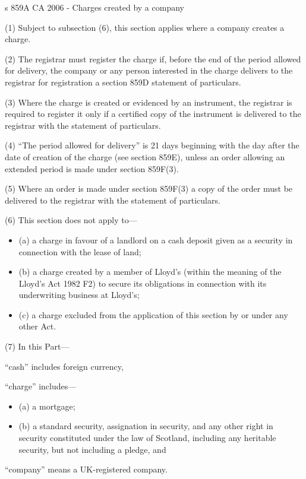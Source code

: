 \documentclass[
]{article}
\providecommand{\tightlist}{%
  \setlength{\itemsep}{0pt}\setlength{\parskip}{0pt}}
\newenvironment{env-99ba4262-5297-4318-9547-86307715f49a}
{
    \savenotes\tcolorbox[blanker,breakable,left=5pt,borderline west={2pt}{-4pt}{green}]
}
{
    \endtcolorbox\spewnotes
}
\begin{document}
\begin{env-99ba4262-5297-4318-9547-86307715f49a}

s 859A CA 2006 - Charges created by a company

(1) Subject to subsection (6), this section applies where a company
creates a charge.

(2) The registrar must register the charge if, before the end of the
period allowed for delivery, the company or any person interested in the
charge delivers to the registrar for registration a section 859D
statement of particulars.

(3) Where the charge is created or evidenced by an instrument, the
registrar is required to register it only if a certified copy of the
instrument is delivered to the registrar with the statement of
particulars.

(4) ``The period allowed for delivery'' is 21 days beginning with the
day after the date of creation of the charge (see section 859E), unless
an order allowing an extended period is made under section 859F(3).

(5) Where an order is made under section 859F(3) a copy of the order
must be delivered to the registrar with the statement of particulars.

(6) This section does not apply to---

\begin{itemize}
\tightlist
\item
  (a) a charge in favour of a landlord on a cash deposit given as a
  security in connection with the lease of land;
\item
  (b) a charge created by a member of Lloyd's (within the meaning of the
  Lloyd's Act 1982 F2) to secure its obligations in connection with its
  underwriting business at Lloyd's;
\item
  (c) a charge excluded from the application of this section by or under
  any other Act.
\end{itemize}

(7) In this Part---

``cash'' includes foreign currency,

``charge'' includes---

\begin{itemize}
\tightlist
\item
  (a) a mortgage;
\item
  (b) a standard security, assignation in security, and any other right
  in security constituted under the law of Scotland, including any
  heritable security, but not including a pledge, and
\end{itemize}

``company'' means a UK-registered company.

\end{env-99ba4262-5297-4318-9547-86307715f49a}
\end{document}
